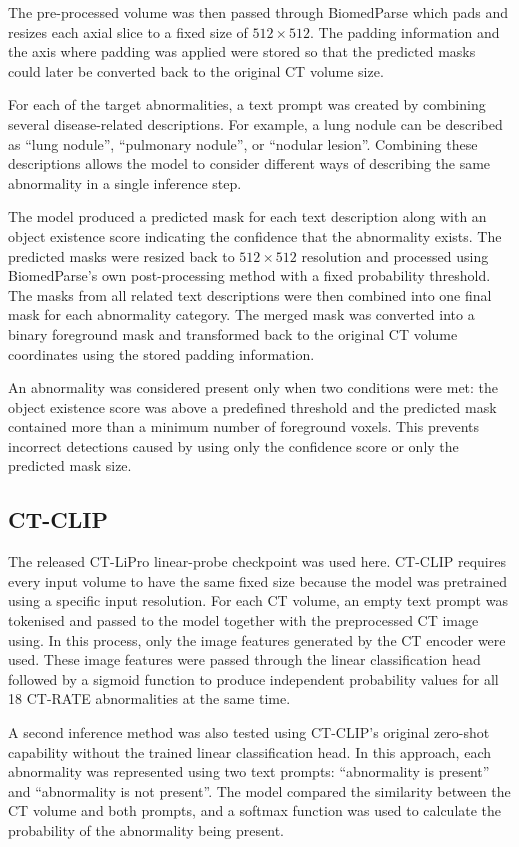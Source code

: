 The pre-processed volume was then passed through BiomedParse which pads and resizes each
axial slice to a fixed size of $512\times512$. The padding information
and the axis where padding was applied were stored so that the predicted
masks could later be converted back to the original CT volume size.

For each of the target abnormalities, a text prompt was created by combining
several disease-related descriptions. For example, a lung nodule can be described as
``lung nodule'', ``pulmonary nodule'', or ``nodular lesion''. Combining
these descriptions allows the model to consider different ways of
describing the same abnormality in a single inference step.

The model produced a predicted mask for each text description along with an object existence score indicating
the confidence that the abnormality exists.
The predicted masks were resized back to $512\times512$ resolution and
processed using BiomedParse's own post-processing method with a fixed
probability threshold. The masks from all related text descriptions were
then combined into one final mask for each abnormality category. The
merged mask was converted into a binary foreground mask and transformed
back to the original CT volume coordinates using the stored padding information.

An abnormality was considered present only when two conditions were met: the object existence score was above a predefined threshold
and the predicted mask contained more than a minimum number of foreground
voxels. This prevents incorrect detections caused by using only the
confidence score or only the predicted mask size.

\subsection{CT-CLIP}

The released CT-LiPro linear-probe checkpoint was used here. CT-CLIP requires every input volume to have the
same fixed size because the model was pretrained using a specific input resolution.
For each CT volume, an empty text prompt was tokenised and passed to the
model together with the preprocessed CT image using. In this process, only the image features
generated by the CT encoder were used. These image features were passed
through the linear classification head followed by a sigmoid function to
produce independent probability values for all 18 CT-RATE abnormalities at the same time.

A second inference method was also tested using CT-CLIP's original
zero-shot capability without the trained linear classification head. In
this approach, each abnormality was represented using two text prompts:
``abnormality is present'' and ``abnormality is not
present''. The model compared the similarity between the CT volume and
both prompts, and a softmax function was used to calculate the probability
of the abnormality being present.

